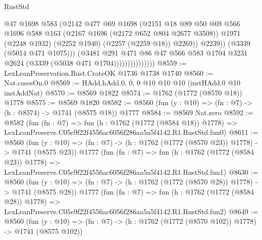 \begin{lexlean}{RustStd}
\begin{coremodule}
                                  @47
                                  @1698
                                  @583
                                  (@2142
                                    @477
                                    @69
                                    @1698
                                    (@2151
                                      @18
                                      @89
                                      @50
                                      @69
                                      @566
                                      @1696
                                      @588
                                      @163
                                      (@2167 @1696 (@2172 @652 @804 @2677 @3508))
                                      @1971
                                      (@2248 @1932)
                                      (@2252 @1940)
                                      (@2257 (@2259 @18))
                                      @2269))
                                  @2239))
                              (@3339 (@5014 @471 @1075)))
                            (@3481
                              @291
                              @471
                              @86
                              @47
                              @566
                              @583
                              @1704
                              @3231
                              @2624
                              (@3339 (@5038 @471 @1704)))))))))))))))
@8559 := LexLeanPreservation.Rust.CrateOK @1736 @1738 @1740
@8560 := Nat.casesOn.{0}
@8569 := HAdd.hAdd.{0, 0, 0} @10 @10 @10 (instHAdd.{0} @10 instAddNat)
@8570 := @8569 @1822
@8574 := @1762 (@1772 (@8570 @18)) @1778
@8575 := @8569 @1820
@8582 := @8560 (fun (y : @10) => (fn : @7) -> (h : @8574) -> @1741 (@8575 @18)) @1777
@8584 := @8569 Nat.zero
@8592 := @8582
    (fun (fn : @7) =>
    fun (h : @1762 (@1772 (@8584 @18)) @1778) =>
    LexLeanPreserve.C05e9f22f4556ac6056f286aa5a5f4142.R1.RustStd.fun0)
@8611 := @8560
    (fun (y : @10) => (fn : @7) -> (h : @1762 (@1772 (@8570 @23)) @1778) -> @1741 (@8575 @23))
    @1777
    (fun (fn : @7) =>
    fun (h : @1762 (@1772 (@8584 @23)) @1778) =>
    LexLeanPreserve.C05e9f22f4556ac6056f286aa5a5f4142.R1.RustStd.fun1)
@8630 := @8560
    (fun (y : @10) => (fn : @7) -> (h : @1762 (@1772 (@8570 @28)) @1778) -> @1741 (@8575 @28))
    @1777
    (fun (fn : @7) =>
    fun (h : @1762 (@1772 (@8584 @28)) @1778) =>
    LexLeanPreserve.C05e9f22f4556ac6056f286aa5a5f4142.R1.RustStd.fun2)
@8649 := @8560
    (fun (y : @10) => (fn : @7) -> (h : @1762 (@1772 (@8570 @102)) @1778) -> @1741 (@8575 @102))

\end{coremodule}
\end{lexlean}
